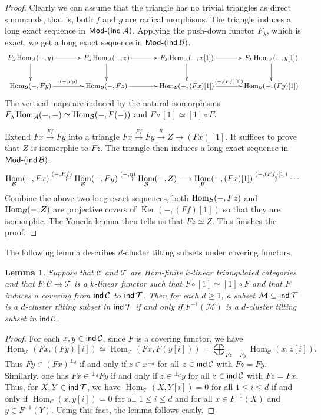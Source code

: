 \documentclass[12pt]{article}
\theoremstyle{plain}
\newtheorem{Lem}[Def]{Lemma}
\theoremstyle{definition}
\DeclareMathOperator{\Hom}{Hom}
\DeclareMathOperator{\Ker}{Ker}
\DeclareMathOperator{\ind}{\sf ind}
\newcommand{\T}{\mathcal{T}}
\def\Modcat#1{{\sf Mod}\mbox{-}{#1}}
\newcommand{\lra}{\longrightarrow}
\newcommand{\lraf}[1]{\stackrel{#1}{\lra}}
\renewcommand{\leq}{\leqslant}
\renewcommand{\geq}{\geqslant}
\begin{document}
\begin{proof}
Clearly we can assume that the triangle has no trivial triangles as direct summands, that is, both $f$ and $g$ are radical morphisms. The triangle induces a long exact sequence in $\Modcat{(\ind\mathcal{A})}$. Applying the push-down functor $F_{\lambda}$, which is exact, we get a long exact sequence in $\Modcat{(\ind\mathcal{B})}$. 
\[\xymatrix@C=13mm{
F_{\lambda}\Hom_{\cal A}(-,y)\ar[r]\ar[d] & F_{\lambda}\Hom_{\cal A}(-,z)\ar[r]\ar[d] & F_{\lambda}\Hom_{\cal A}(-,x[1])\ar[r]\ar[d] & F_{\lambda}\Hom_{\cal A}(-,y[1])\ar[d]\\
\Hom_{\cal B}(-,Fy)\ar[r]^{(-,Fg)} & \Hom_{\cal B}(-,Fz)\ar[r] & \Hom_{\cal B}(-,(Fx)[1])\ar[r]^{(-,(Ff)[1])} & \Hom_{\cal B}(-,(Fy)[1])\\
}\]
The vertical maps are induced by the natural isomorphisms $F_{\lambda}\Hom_{\cal A}(-,-)\simeq \Hom_{\cal B}(-,F(-))$ and $F\circ  [1]\simeq [1]\circ F$. 

Extend $Fx\lraf{Ff} Fy$ into a triangle $Fx\lraf{Ff} Fy\lraf{\eta} Z\lra (Fx)[1]$. It suffices to prove that $Z$ is isomorphic to $Fz$. The triangle then induces a long exact sequence in $\Modcat{(\ind{\cal B})}$.
\[\Hom_{\cal B}(-, Fx)\lraf{(-,Ff)}\Hom_{\cal B}(-,Fy)\lraf{(-,\eta)}\Hom_{\cal B}(-, Z)\lra \Hom_{\cal B}(-,(Fx)[1])\lraf{(-,(Ff)[1])}\cdots\] 
Combine the above two long exact sequences, both $\Hom_{\cal B}(-, Fz)$ and $\Hom_{\cal B}(-, Z)$ are projective covers of $\Ker (-,(Ff)[1])$ so that they are isomorphic. The Yoneda lemma then tells us that $Fz\simeq Z$. This finishes the proof. 
\end{proof}

The following lemma describes $d$-cluster tilting subsets under covering functors. 

\begin{Lem}\label{lem-covering-dct}
Suppose that $\mathcal{C}$ and $\T$ are Hom-finite $k$-linear triangulated categories and that $F:\mathcal{C}\lra\T$ is a $k$-linear functor such that $F\circ [1]\simeq [1]\circ F$ and that $F$ induces a covering from $\ind\mathcal{C}$ to $\ind\T$.  Then for each $d\geq 1$, a subset $\mathcal{M}\subseteq\ind\T$ is a $d$-cluster tilting subset in $\ind\T$ if and only if $F^{-1}(\mathcal{M})$ is a $d$-cluster tilting subset in $\ind\mathcal{C}$.
\end{Lem}
\begin{proof}
For each $x,y\in \ind\mathcal{C}$, since $F$ is a covering functor, we have 
\[\Hom_{\T}(Fx, (Fy)[i])\simeq\Hom_{\T}(Fx,F(y[i]))=\bigoplus_{Fz=Fy}\Hom_{\mathcal{C}}(x,z[i]).\]
Thus $Fy\in (Fx)^{\perp_d}$ if and only if $z\in x^{\perp_d}$ for all $z\in\ind\mathcal{C}$ with $Fz=Fy$. Similarly, one has $Fx\in {}^{\perp_d}Fy$ if and only if $z\in {}^{\perp_d}y$ for all $z\in\ind\mathcal{C}$ with $Fz=Fx$. Thus, for $X,Y\in\ind\T$, we have $\Hom_{\T}(X,Y[i])=0$ for all $1\leq i\leq d$ if and only if $\Hom_{\mathcal{C}}(x,y[i])=0$ for all $1\leq i\leq d$ and for all $x\in F^{-1}(X)$ and $y\in F^{-1}(Y)$. Using this fact, the lemma follows easily. 
\end{proof}
\end{document}
